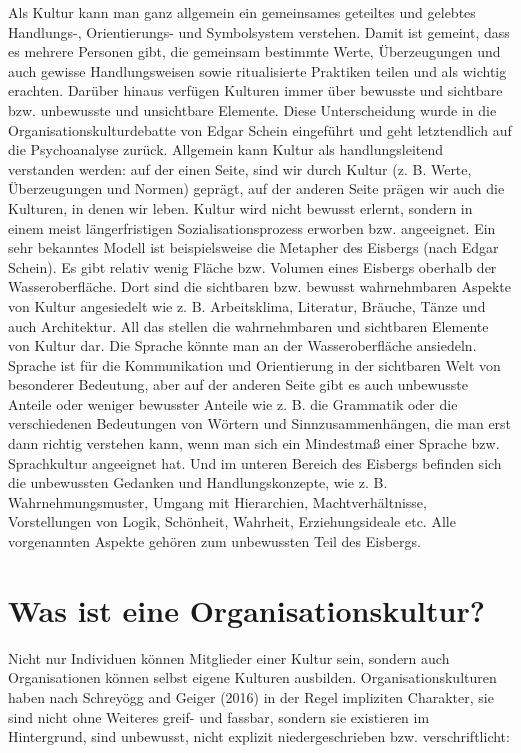 \documentclass[
  letterpaper,
]{book}
\begin{document}
Als Kultur kann man ganz allgemein ein gemeinsames geteiltes und
gelebtes Handlungs-, Orientierungs- und Symbolsystem verstehen. Damit
ist gemeint, dass es mehrere Personen gibt, die gemeinsam bestimmte
Werte, Überzeugungen und auch gewisse Handlungsweisen sowie
ritualisierte Praktiken teilen und als wichtig erachten. Darüber hinaus
verfügen Kulturen immer über bewusste und sichtbare bzw. unbewusste und
unsichtbare Elemente. Diese Unterscheidung wurde in die
Organisationskulturdebatte von Edgar Schein eingeführt und geht
letztendlich auf die Psychoanalyse zurück. Allgemein kann Kultur als
handlungsleitend verstanden werden: auf der einen Seite, sind wir durch
Kultur (z. B. Werte, Überzeugungen und Normen) geprägt, auf der anderen
Seite prägen wir auch die Kulturen, in denen wir leben. Kultur wird
nicht bewusst erlernt, sondern in einem meist längerfristigen
Sozialisationsprozess erworben bzw. angeeignet. Ein sehr bekanntes
Modell ist beispielsweise die Metapher des Eisbergs (nach Edgar Schein).
Es gibt relativ wenig Fläche bzw. Volumen eines Eisbergs oberhalb der
Wasseroberfläche. Dort sind die sichtbaren bzw. bewusst wahrnehmbaren
Aspekte von Kultur angesiedelt wie z. B. Arbeitsklima, Literatur,
Bräuche, Tänze und auch Architektur. All das stellen die wahrnehmbaren
und sichtbaren Elemente von Kultur dar. Die Sprache könnte man an der
Wasseroberfläche ansiedeln. Sprache ist für die Kommunikation und
Orientierung in der sichtbaren Welt von besonderer Bedeutung, aber auf
der anderen Seite gibt es auch unbewusste Anteile oder weniger bewusster
Anteile wie z. B. die Grammatik oder die verschiedenen Bedeutungen von
Wörtern und Sinnzusammenhängen, die man erst dann richtig verstehen
kann, wenn man sich ein Mindestmaß einer Sprache bzw. Sprachkultur
angeeignet hat. Und im unteren Bereich des Eisbergs befinden sich die
unbewussten Gedanken und Handlungskonzepte, wie z. B.
Wahrnehmungsmuster, Umgang mit Hierarchien, Machtverhältnisse,
Vorstellungen von Logik, Schönheit, Wahrheit, Erziehungsideale etc. Alle
vorgenannten Aspekte gehören zum unbewussten Teil des Eisbergs.

\section{Was ist eine
Organisationskultur?}\label{was-ist-eine-organisationskultur}

Nicht nur Individuen können Mitglieder einer Kultur sein, sondern auch
Organisationen können selbst eigene Kulturen ausbilden.
Organisationskulturen haben nach Schreyögg and Geiger (2016) in der
Regel impliziten Charakter, sie sind nicht ohne Weiteres greif- und
fassbar, sondern sie existieren im Hintergrund, sind unbewusst, nicht
explizit niedergeschrieben bzw. verschriftlicht:
\end{document}
